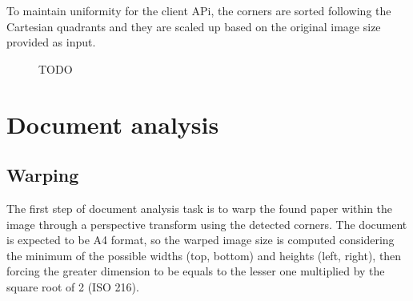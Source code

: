 \documentclass[a4paper]{article}
\begin{document}
To maintain uniformity for the client APi, the corners are sorted following the Cartesian quadrants and they are scaled up based on the original image size provided as input.

\begin{figure}[H]
	\caption{TODO}
	\label{fig:computingcorners}
\end{figure}

\section{Document analysis}

\subsection{Warping}

The first step of document analysis task is to warp the found paper within the image through a perspective transform using the detected corners. The document is expected to be A4 format, so the warped image size is computed considering the minimum of the possible widths (top, bottom) and heights (left, right), then forcing the greater dimension to be equals to the lesser one multiplied by the square root of 2 (ISO 216).
\end{document}
